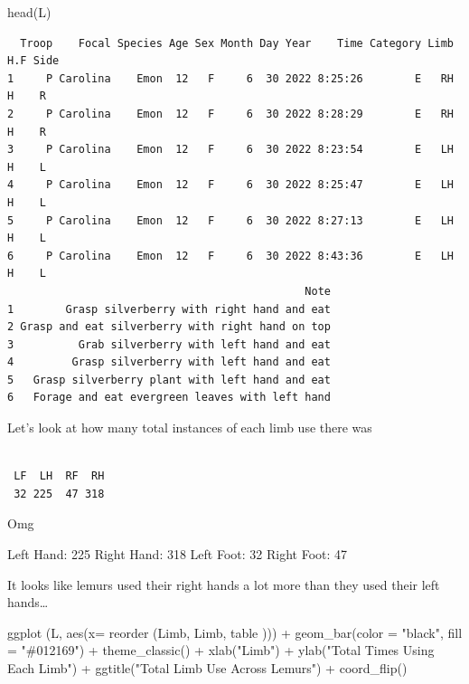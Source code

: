 \documentclass[
  letterpaper,
  DIV=11,
  numbers=noendperiod]{scrartcl}
\newenvironment{Shaded}{\begin{snugshade}}{\end{snugshade}}
\newcommand{\AttributeTok}[1]{\textcolor[rgb]{0.40,0.45,0.13}{#1}}
\newcommand{\FunctionTok}[1]{\textcolor[rgb]{0.28,0.35,0.67}{#1}}
\newcommand{\NormalTok}[1]{\textcolor[rgb]{0.00,0.23,0.31}{#1}}
\newcommand{\SpecialCharTok}[1]{\textcolor[rgb]{0.37,0.37,0.37}{#1}}
\newcommand{\StringTok}[1]{\textcolor[rgb]{0.13,0.47,0.30}{#1}}
\begin{document}
\begin{Shaded}
\begin{Highlighting}[]
\FunctionTok{head}\NormalTok{(L)}
\end{Highlighting}
\end{Shaded}

\begin{verbatim}
  Troop    Focal Species Age Sex Month Day Year    Time Category Limb H.F Side
1     P Carolina    Emon  12   F     6  30 2022 8:25:26        E   RH   H    R
2     P Carolina    Emon  12   F     6  30 2022 8:28:29        E   RH   H    R
3     P Carolina    Emon  12   F     6  30 2022 8:23:54        E   LH   H    L
4     P Carolina    Emon  12   F     6  30 2022 8:25:47        E   LH   H    L
5     P Carolina    Emon  12   F     6  30 2022 8:27:13        E   LH   H    L
6     P Carolina    Emon  12   F     6  30 2022 8:43:36        E   LH   H    L
                                              Note
1        Grasp silverberry with right hand and eat
2 Grasp and eat silverberry with right hand on top
3          Grab silverberry with left hand and eat
4         Grasp silverberry with left hand and eat
5   Grasp silverberry plant with left hand and eat
6   Forage and eat evergreen leaves with left hand
\end{verbatim}

Let's look at how many total instances of each limb use there was

\begin{Shaded}
\end{Shaded}

\begin{verbatim}

 LF  LH  RF  RH 
 32 225  47 318 
\end{verbatim}

Omg

Left Hand: 225 Right Hand: 318 Left Foot: 32 Right Foot: 47

It looks like lemurs used their right hands a lot more than they used
their left hands\ldots{}

\begin{Shaded}
\begin{Highlighting}[]
 \FunctionTok{ggplot}\NormalTok{ (L, }\FunctionTok{aes}\NormalTok{(}\AttributeTok{x=} \FunctionTok{reorder}\NormalTok{ (Limb, Limb, table ))) }\SpecialCharTok{+}
  \FunctionTok{geom\_bar}\NormalTok{(}\AttributeTok{color =} \StringTok{"black"}\NormalTok{, }\AttributeTok{fill =} \StringTok{"\#012169"}\NormalTok{) }\SpecialCharTok{+}
  \FunctionTok{theme\_classic}\NormalTok{() }\SpecialCharTok{+}
  \FunctionTok{xlab}\NormalTok{(}\StringTok{"Limb"}\NormalTok{) }\SpecialCharTok{+}
  \FunctionTok{ylab}\NormalTok{(}\StringTok{"Total Times Using Each Limb"}\NormalTok{) }\SpecialCharTok{+}
  \FunctionTok{ggtitle}\NormalTok{(}\StringTok{"Total Limb Use Across Lemurs"}\NormalTok{) }\SpecialCharTok{+}
  \FunctionTok{coord\_flip}\NormalTok{()}
\end{Highlighting}
\end{Shaded}
\end{document}
